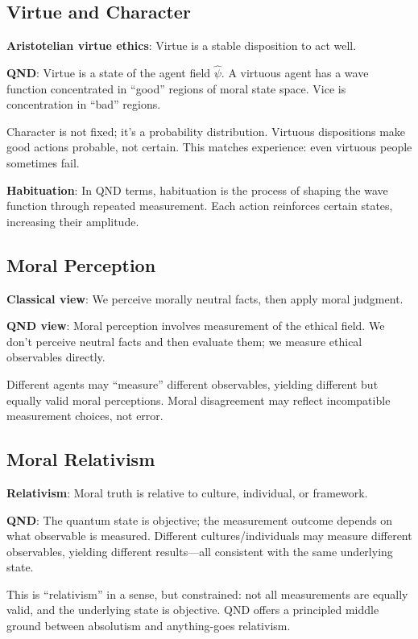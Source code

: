 \documentclass[12pt]{article}
\begin{document}
\subsection{Virtue and Character}

\textbf{Aristotelian virtue ethics}: Virtue is a stable disposition to act well.

\textbf{QND}: Virtue is a state of the agent field $\hat{\psi}$. A virtuous agent has a wave function concentrated in ``good'' regions of moral state space. Vice is concentration in ``bad'' regions.

Character is not fixed; it's a probability distribution. Virtuous dispositions make good actions probable, not certain. This matches experience: even virtuous people sometimes fail.

\textbf{Habituation}: In QND terms, habituation is the process of shaping the wave function through repeated measurement. Each action reinforces certain states, increasing their amplitude.

\subsection{Moral Perception}

\textbf{Classical view}: We perceive morally neutral facts, then apply moral judgment.

\textbf{QND view}: Moral perception involves measurement of the ethical field. We don't perceive neutral facts and then evaluate them; we measure ethical observables directly.

Different agents may ``measure'' different observables, yielding different but equally valid moral perceptions. Moral disagreement may reflect incompatible measurement choices, not error.

\subsection{Moral Relativism}

\textbf{Relativism}: Moral truth is relative to culture, individual, or framework.

\textbf{QND}: The quantum state is objective; the measurement outcome depends on what observable is measured. Different cultures/individuals may measure different observables, yielding different results---all consistent with the same underlying state.

This is ``relativism'' in a sense, but constrained: not all measurements are equally valid, and the underlying state is objective. QND offers a principled middle ground between absolutism and anything-goes relativism.
\end{document}
